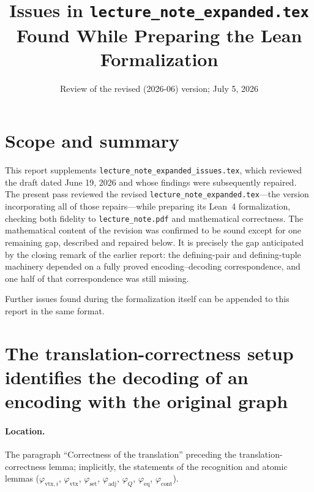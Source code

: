 \documentclass[11pt]{article}
\title{Issues in \texttt{lecture\_note\_expanded.tex}\\
  Found While Preparing the Lean Formalization}
\author{}
\date{Review of the revised (2026-06) version; July 5, 2026}
\begin{document}
\maketitle

\section*{Scope and summary}

This report supplements \texttt{lecture\_note\_expanded\_issues.tex}, which
reviewed the draft dated June 19, 2026 and whose findings were subsequently
repaired.  The present pass reviewed the revised
\texttt{lecture\_note\_expanded.tex}---the version incorporating all of those
repairs---while preparing its Lean~4 formalization, checking both fidelity to
\texttt{lecture\_note.pdf} and mathematical correctness.  The mathematical
content of the revision was confirmed to be sound except for one remaining
gap, described and repaired below.  It is precisely the gap anticipated by
the closing remark of the earlier report: the defining-pair and
defining-tuple machinery depended on a fully proved encoding--decoding
correspondence, and one half of that correspondence was still missing.

Further issues found during the formalization itself can be appended to this
report in the same format.

\section{The translation-correctness setup identifies the decoding of an
encoding with the original graph}

\paragraph{Location.} The paragraph ``Correctness of the translation''
preceding the translation-correctness lemma; implicitly, the statements of
the recognition and atomic lemmas (\(\varphi_{\mathrm{vtx},i}\),
\(\varphi_{\mathrm{vtx}}\), \(\varphi_{\mathrm{set}}\),
\(\varphi_{\mathrm{adj}}\), \(\varphi_Q\), \(\varphi_{\mathrm{eq}}\),
\(\varphi_{\mathrm{cont}}\)).
\end{document}
